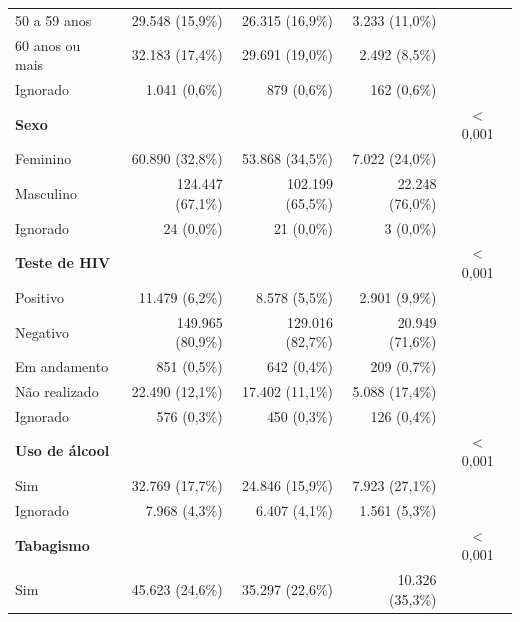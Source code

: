\begin{longtable}{@{}l@{\extracolsep{\fill}}rrrc@{}}
        \hspace{3mm}50 a 59 anos & 29.548 (15,9\%) & 26.315 (16,9\%) & 3.233 (11,0\%) &  \\
        \hspace{3mm}60 anos ou mais & 32.183 (17,4\%) & 29.691 (19,0\%) & 2.492 (8,5\%) &  \\
        \hspace{3mm}Ignorado & 1.041 (0,6\%) & 879 (0,6\%) & 162 (0,6\%) &  \\
        \textbf{Sexo} &  &  &  & $<$ 0,001 \\
        \hspace{3mm}Feminino & 60.890 (32,8\%) & 53.868 (34,5\%) & 7.022 (24,0\%) &  \\
        \hspace{3mm}Masculino & 124.447 (67,1\%) & 102.199 (65,5\%) & 22.248 (76,0\%) &  \\
        \hspace{3mm}Ignorado & 24 (0,0\%) & 21 (0,0\%) & 3 (0,0\%) &  \\
        \textbf{Teste de HIV} &  &  &  & $<$ 0,001 \\
        \hspace{3mm}Positivo & 11.479 (6,2\%) & 8.578 (5,5\%) & 2.901 (9,9\%) &  \\
        \hspace{3mm}Negativo & 149.965 (80,9\%) & 129.016 (82,7\%) & 20.949 (71,6\%) &  \\
        \hspace{3mm}Em andamento & 851 (0,5\%) & 642 (0,4\%) & 209 (0,7\%) &  \\
        \hspace{3mm}Não realizado & 22.490 (12,1\%) & 17.402 (11,1\%) & 5.088 (17,4\%) &  \\
        \hspace{3mm}Ignorado & 576 (0,3\%) & 450 (0,3\%) & 126 (0,4\%) &  \\
        \textbf{Uso de álcool} &  &  &  & $<$ 0,001 \\
        \hspace{3mm}Sim & 32.769 (17,7\%) & 24.846 (15,9\%) & 7.923 (27,1\%) &  \\
        \hspace{3mm}Ignorado & 7.968 (4,3\%) & 6.407 (4,1\%) & 1.561 (5,3\%) &  \\
        \textbf{Tabagismo} &  &  &  & $<$ 0,001 \\
        \hspace{3mm}Sim & 45.623 (24,6\%) & 35.297 (22,6\%) & 10.326 (35,3\%) &  \\

\end{longtable}
